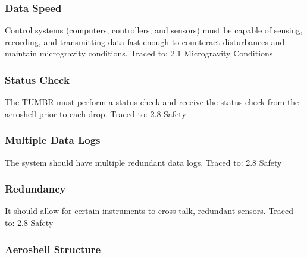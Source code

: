 \subsubsection*{Data Speed}
\indent\indent Control systems (computers, controllers, and sensors) must be capable of sensing, recording, and transmitting data fast enough to counteract disturbances and maintain microgravity conditions. Traced to: 2.1 Microgravity Conditions

\subsubsection*{Status Check}
\indent\indent The TUMBR must perform a status check and receive the status check from the aeroshell prior to each drop. Traced to: 2.8 Safety

\subsubsection*{Multiple Data Logs}
\indent\indent The system should have multiple redundant data logs. Traced to: 2.8 Safety

\subsubsection*{Redundancy}
\indent\indent It should allow for certain instruments to cross-talk, redundant sensors. Traced to: 2.8 Safety 

\subsubsection{Aeroshell Structure}

